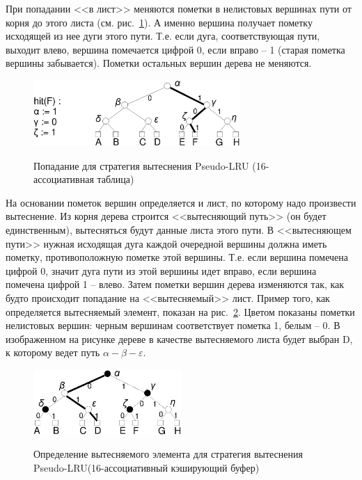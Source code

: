 \documentclass[14pt]{extreport}
\newcommand{\PseudoLRU}{\textsf{Pseudo-LRU}\xspace}
\begin{document}
При попадании <<в лист>> меняются пометки в нелистовых вершинах пути от корня до
этого листа (см. рис.~\ref{pseudo_lru_hit}). А именно вершина получает пометку
исходящей из нее дуги этого пути. Т.е. если дуга, соответствующая пути, выходит
влево, вершина помечается цифрой 0, если вправо -- 1 (старая пометка вершины
забывается). Пометки остальных вершин дерева не меняются.

\begin{figure}[h] \center
  \includegraphics[width=0.7\textwidth]{2.theor/plruhit}\\
  \caption{Попадание для стратегия вытеснения \PseudoLRU
  (16-ассоциативная таблица)}\label{pseudo_lru_hit}
\end{figure}

На основании пометок вершин определяется и лист, по которому надо произвести
вытеснение.
Из корня дерева строится <<вытесняющий путь>> (он будет единственным),
вытесняться будут данные листа этого пути. В <<вытесняющем пути>> нужная
исходящая дуга каждой очередной вершины должна иметь пометку, противоположную
пометке этой вершины. Т.е. если вершина помечена цифрой 0, значит дуга пути из
этой вершины идет вправо, если вершина помечена цифрой 1 -- влево. Затем пометки
вершин дерева изменяются так, как будто происходит попадание на <<вытесняемый>>
лист. Пример того, как определяется вытесняемый элемент, показан на
рис.~\ref{pseudo_lru_miss}. Цветом показаны пометки нелистовых вершин: черным
вершинам соответствует пометка 1, белым
-- 0. В изображенном на рисунке дереве в качестве вытесняемого листа будет
выбран D, к которому ведет путь $\alpha-\beta-\varepsilon$.

\begin{figure}[h] \center
  \includegraphics[width=0.5\textwidth]{2.theor/plrumiss}\\
  \caption{Определение вытесняемого элемента для стратегия вытеснения
  \PseudoLRU (16-ассоциативный кэширующий буфер)}\label{pseudo_lru_miss}
\end{figure}
\end{document}
